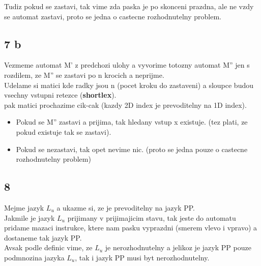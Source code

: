 \documentclass[a4paper]{article}
\begin{document}
Tudiz pokud se zastavi, tak vime zda paska je po skonceni prazdna, ale
ne vzdy se automat zastavi, proto se jedna o castecne rozhodnutelny problem.


\subsection*{7 b}

Vezmeme automat M' z predchozi ulohy a vyvorime totozny automat M'' jen s rozdilem, ze M'' se zastavi po n krocich a neprijme.\\
Udelame si matici kde radky jsou n (pocet kroku do zastaveni) a
sloupce budou vsechny vstupni retezce (\textbf{shortlex}).\\
pak matici prochazime cik-cak (kazdy 2D index je prevoditelny na 1D index).\\
\begin{itemize}
    \item Pokud se M'' zastavi a prijima, tak hledany vstup x existuje. (tez plati, ze pokud existuje tak se zastavi).\\
    \item Pokud se nezastavi, tak opet nevime nic. (proto se jedna pouze o castecne rozhodnutelny problem) 
\end{itemize}


\subsection*{8}

Mejme jazyk $L_u$ a ukazme si, ze je prevoditelny na jazyk PP.\\
Jakmile je jazyk $L_u$ prijimany v prijimajicim stavu, tak jeste do automatu pridame mazaci instrukce,
ktere nam pasku vyprazdni (smerem vlevo i vpravo) a dostaneme tak jazyk PP.\\
Avsak podle definic vime, ze $L_u$ je nerozhodnutelny a jelikoz je jazyk PP pouze podmnozina jazyka $L_u$, tak i jazyk PP musi byt nerozhodnutelny.
\end{document}
